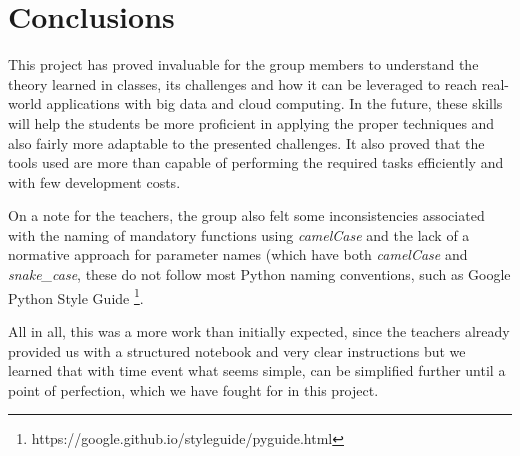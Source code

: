 \documentclass[10pt,twocolumn]{article}
\begin{document}
\section{Conclusions}
This project has proved invaluable for the group members to understand the theory learned in classes, its challenges and how it can be leveraged to reach real-world applications with big data and cloud computing. In the future, these skills will help the students be more proficient in applying the proper techniques and also fairly more adaptable to the presented challenges. It also proved that the tools used are more than capable of performing the required tasks efficiently and with few development costs. 

On a note for the teachers, the group also felt some inconsistencies associated with the naming of mandatory functions using \textit{camelCase} and the lack of a normative approach for parameter names (which have both \textit{camelCase} and \textit{snake\_case}, these do not follow most Python naming conventions, such as Google Python Style Guide \footnote{https://google.github.io/styleguide/pyguide.html}.

All in all, this was a more work than initially expected, since the teachers already provided us with a structured notebook and very clear instructions but we learned that with time event what seems simple, can be simplified further until a point of perfection, which we have fought for in this project.
\end{document}
